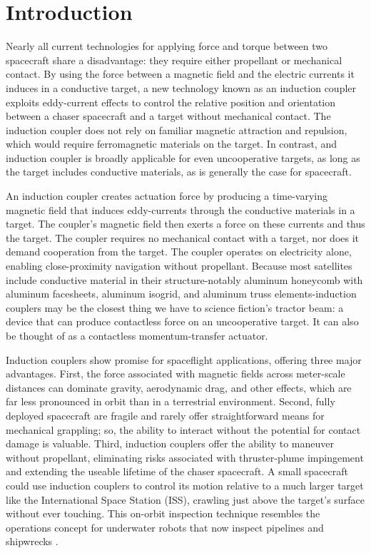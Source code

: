 \section{Introduction} 


Nearly all current technologies for applying force and torque between two spacecraft share a disadvantage: they require either propellant or mechanical contact. By using the force between a magnetic field and the electric currents it induces in a conductive target, a new technology known as an induction coupler exploits eddy-current effects to control the relative position and orientation between a chaser spacecraft and a target without mechanical contact. The induction coupler does not rely on familiar magnetic attraction and repulsion, which would require ferromagnetic materials on the target.  In contrast, and induction coupler is broadly applicable for even uncooperative targets, as long as the target includes conductive materials, as is generally the case for spacecraft.

An induction coupler creates actuation force by producing a time-varying magnetic field that induces eddy-currents  through the conductive materials in a target. The coupler's magnetic field then exerts a force on these currents and thus the target. The coupler requires no mechanical contact with a target, nor does it demand cooperation from the target. The coupler operates on electricity alone, enabling close-proximity navigation without propellant. Because most satellites include conductive material in their structure-notably aluminum honeycomb with aluminum facesheets, aluminum isogrid, and aluminum truss elements-induction couplers may be the closest thing we have to science fiction's tractor beam: a device that can produce contactless force on an uncooperative target. It can also be thought of as a contactless momentum-transfer actuator.

Induction couplers show promise for spaceflight applications, offering three major advantages. First, the force associated with magnetic fields across meter-scale distances can dominate gravity, aerodynamic drag, and other effects, which are far less pronounced in orbit than in a terrestrial environment. Second, fully deployed spacecraft are fragile and rarely offer straightforward means for mechanical grappling; so, the ability to interact without the potential for contact damage is valuable. Third, induction couplers offer the ability to maneuver without propellant, eliminating risks associated with thruster-plume impingement \cite{BaerwaldR.S.1977}
and extending the useable lifetime of the chaser spacecraft.
A small spacecraft could use induction couplers to control its motion relative to a much larger target like the International Space Station (ISS), crawling just above the target's surface without ever touching. This on-orbit inspection technique resembles the operations concept for underwater robots that now inspect pipelines and shipwrecks \cite{Whitcomb2000}.

